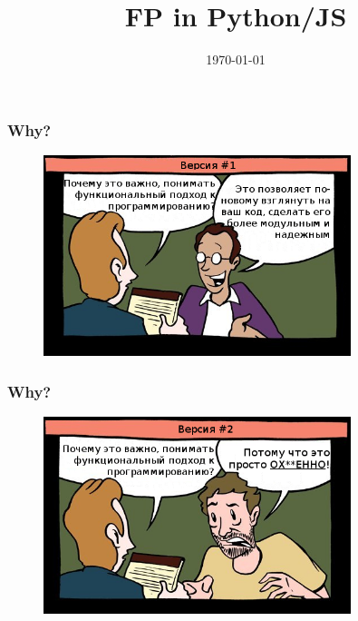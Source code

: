\documentclass[18pt, compress, aspectratio=169]{beamer}
\title{FP in Python/JS}
\date{\today}
\institute{}
\begin{document}
\fontsize{19pt}{20}\selectfont
\maketitle

\section{}

\begin{frame}
    \frametitle{Why?}
    \vspace{-25pt}
    \begin{figure}
        \includegraphics[width=0.8\textwidth,center]{first_option.png}
    \end{figure}
\end{frame}

\begin{frame}
    \frametitle{Why?}
    \vspace{-25pt}
    \begin{figure}
        \includegraphics[width=0.8\textwidth,center]{second_option.png}
    \end{figure}
\end{frame}
\end{document}
